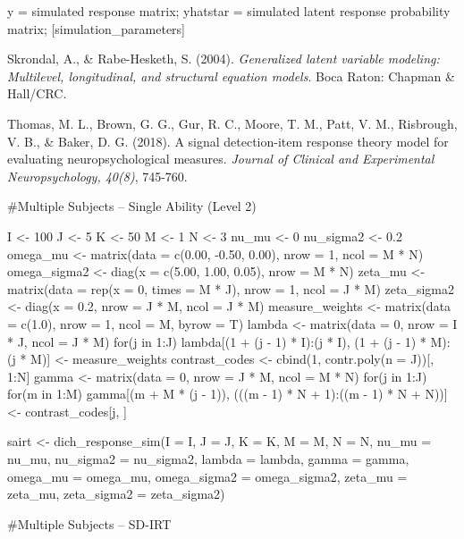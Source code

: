 \documentclass[a4paper]{book}
\begin{document}
%
\begin{Value}
y = simulated response matrix; yhatstar = simulated latent response
probability matrix; [simulation\_parameters]
\end{Value}
%
\begin{References}\relax
Skrondal, A., \& Rabe-Hesketh, S. (2004). \emph{Generalized latent variable
modeling: Multilevel, longitudinal, and structural equation models}. Boca
Raton: Chapman \& Hall/CRC.

Thomas, M. L., Brown, G. G., Gur, R. C., Moore, T. M., Patt,
V. M., Risbrough, V. B., \& Baker, D. G. (2018). A signal detection-item
response theory model for evaluating neuropsychological measures.
\emph{Journal of Clinical and Experimental Neuropsychology, 40(8)}, 745-760.
\end{References}
%
\begin{Examples}
\begin{ExampleCode}

#Multiple Subjects -- Single Ability (Level 2)

I <- 100
J <- 5
K <- 50
M <- 1
N <- 3
nu_mu <- 0
nu_sigma2 <- 0.2
omega_mu <- matrix(data = c(0.00, -0.50, 0.00), nrow = 1, ncol = M * N)
omega_sigma2 <- diag(x = c(5.00, 1.00, 0.05), nrow = M * N)
zeta_mu <- matrix(data = rep(x = 0, times = M * J), nrow = 1, ncol = J * M)
zeta_sigma2 <- diag(x = 0.2, nrow = J * M, ncol = J * M)
measure_weights <- matrix(data = c(1.0), nrow = 1, ncol = M, byrow = T)
lambda <- matrix(data = 0, nrow = I * J, ncol = J * M)
for(j in 1:J) {
 lambda[(1 + (j - 1) * I):(j * I), (1 + (j - 1) * M):(j * M)] <-
   measure_weights
}
contrast_codes <- cbind(1, contr.poly(n = J))[, 1:N]
gamma <- matrix(data = 0, nrow = J * M, ncol = M * N)
for(j in 1:J) {
  for(m in 1:M) {
    gamma[(m + M * (j - 1)), (((m - 1) * N + 1):((m - 1) * N + N))] <-
    contrast_codes[j, ]
  }
}

sairt <- dich_response_sim(I = I, J = J, K = K, M = M, N = N, nu_mu = nu_mu,
                           nu_sigma2 = nu_sigma2, lambda = lambda,
                           gamma = gamma, omega_mu = omega_mu,
                           omega_sigma2 = omega_sigma2, zeta_mu = zeta_mu,
                           zeta_sigma2 = zeta_sigma2)

#Multiple Subjects -- SD-IRT


\end{ExampleCode}
\end{Examples}
\end{document}
